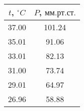 \begin{tabular}{c|c}
\toprule
$t$, $^\circ C$ & $P$, $мм. рт. ст.$ \\
\midrule
37.00 & 101.24 \\
35.01 & 91.06 \\
33.01 & 82.13 \\
31.00 & 73.74 \\
29.01 & 64.97 \\
26.96 & 58.88 \\
\bottomrule
\end{tabular}
